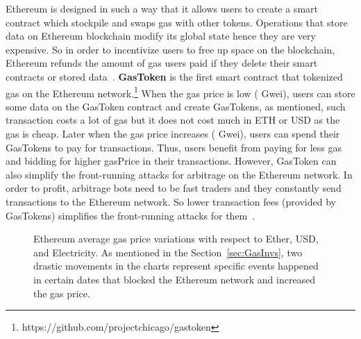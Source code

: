 Ethereum is designed in such a way that it allows users to create a smart contract which stockpile and swaps gas with other tokens. Operations that store data on Ethereum blockchain modify its global state hence they are very expensive. So in order to incentivize users to free up space on the blockchain, Ethereum refunds the amount of gas users paid if they delete their smart contracts or stored data~\cite{wood2014ethereum}. \textbf{GasToken} is the first smart contract that tokenized gas on the Ethereum network.\footnote{https://github.com/projectchicago/gastoken} When the gas price is low ( Gwei), users can store some data on the GasToken contract and create GasTokens, as mentioned, such transaction costs a lot of gas but it does not cost much in ETH or USD as the gas is cheap. Later when the gas price increases ( Gwei), users can spend their GasTokens to pay for transactions. Thus, users benefit from paying for less gas and bidding for higher \textsf{gasPrice} in their transactions. However, GasToken can also simplify the front-running attacks for arbitrage on the Ethereum network. In order to profit, arbitrage bots need to be fast traders and they constantly send transactions to the Ethereum network. So lower transaction fees (provided by GasTokens) simplifies the front-running attacks for them~\cite{Eskandari2019SoKTD}.


\begin{figure}[!htb]

	\centering
	\hfill
	\caption {Ethereum average gas price variations with respect to Ether, USD, and Electricity. As mentioned in the Section~\ref{sec:GasInvs}, two drastic movements in the charts represent specific events happened in certain dates  that blocked the Ethereum network and increased the gas price.}
	\label{fig:gas}

\end{figure}

